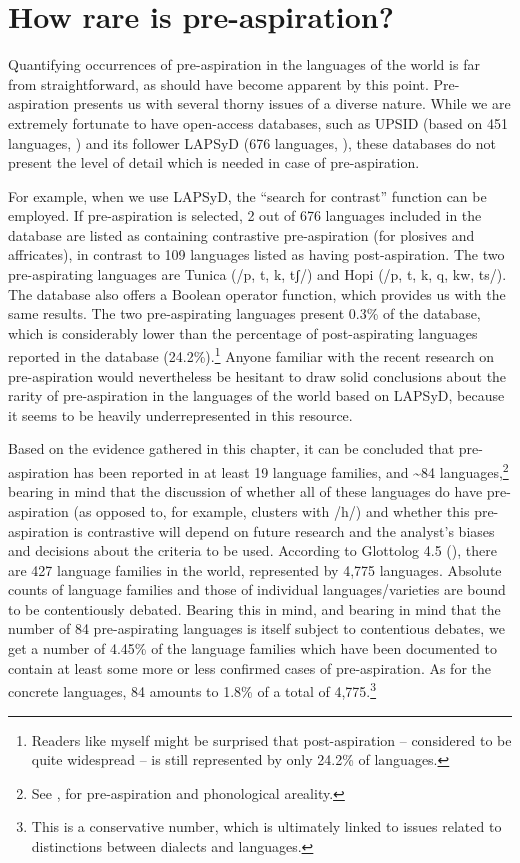 \documentclass[output=paper]{langscibook}
\begin{document}
\section{How rare is pre-aspiration?}\label{sec:hejna:5}

Quantifying occurrences of pre\hyp aspiration in the languages of the world is far from straightforward, as should have become apparent by this point. Pre-as\-pi\-ra\-tion presents us with several thorny issues of a diverse nature. While we are extremely fortunate to have open-access databases, such as UPSID (based on 451 languages, \citealt{MaddiesonPrecoda1990}) and its follower LAPSyD (676 languages, \citealt{MaddiesonEtAl2016}), these databases do not present the level of detail which is needed in case of pre-aspiration.

For example, when we use LAPSyD, the “search for contrast” function can be employed. If pre\hyp aspiration is selected, 2 out of 676 languages included in the database are listed as containing contrastive pre\hyp aspiration (for plosives and affricates), in contrast to 109 languages listed as having post-aspiration. The two pre-aspirating languages are Tunica (/p, t, k, tʃ/) and Hopi (/p, t, k, q, kw, ts/). The database also offers a Boolean operator function, which provides us with the same results. The two pre-aspirating languages present 0.3\% of the database, which is considerably lower than the percentage of post-aspirating languages reported in the database (24.2\%).\footnote{Readers like myself might be surprised that post-aspiration – considered to be quite widespread – is still represented by only 24.2\% of languages.} Anyone familiar with the recent research on pre\hyp aspiration would nevertheless be hesitant to draw solid conclusions about the rarity of pre\hyp aspiration in the languages of the world based on LAPSyD, because it seems to be heavily underrepresented in this resource.

Based on the evidence gathered in this chapter, it can be concluded that pre\hyp aspiration has been reported in at least 19 language families, and {\textasciitilde}84 languages,\footnote{See , for pre\hyp aspiration and phonological areality.} bearing in mind that the discussion of whether all of these languages do have pre\hyp aspiration (as opposed to, for example, clusters with /h/) and whether this pre\hyp aspiration is contrastive will depend on future research and the analyst’s biases and decisions about the criteria to be used. According to Glottolog 4.5 (\citealt{NordhoffHammarström2011}), there are 427 language families in the world, represented by 4,775 languages. Absolute counts of language families and those of individual languages/varieties are bound to be contentiously debated. Bearing this in mind, and bearing in mind that the number of 84 pre-aspirating languages is itself subject to contentious debates, we get a number of 4.45\% of the language families which have been documented to contain at least some more or less confirmed cases of pre-aspiration. As for the concrete languages, 84 amounts to 1.8\% of a total of 4,775.\footnote{This is a conservative number, which is ultimately linked to issues related to distinctions between dialects and languages.}
\end{document}
